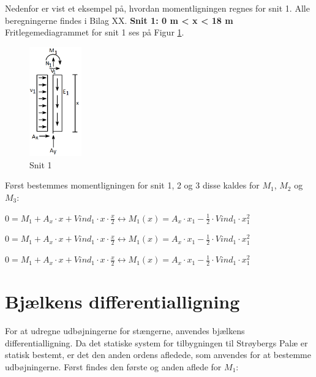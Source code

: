 Nedenfor er vist et eksempel på, hvordan momentligningen regnes for snit 1. Alle beregningerne findes i Bilag XX.
\newline
\newline
\textbf{Snit 1: 0 m < x < 18 m}
\newline
Fritlegemediagrammet for snit 1 ses på Figur \ref{fig:snitetan}.
\begin{figure}[H]
	\centering
	\includegraphics[width=0.2\textwidth]{billeder/asnitet.png}
	\caption{Snit 1}
	\label{fig:snitetan}
\end{figure}


Først bestemmes momentligningen for snit 1, 2 og 3 disse kaldes for $M_1$, $M_2$ og $M_3$:
\begin{center}
	$0 = M_1 + A_x \cdot x + Vind_1\cdot x\cdot \frac{x}{2} \leftrightarrow M_1(x) = A_x\cdot x_1 -\frac{1}{2}\cdot Vind_1 \cdot x_1^2$
\end{center}

\begin{center}
	$0 = M_1 + A_x \cdot x + Vind_1\cdot x\cdot \frac{x}{2} \leftrightarrow M_1(x) = A_x\cdot x_1 -\frac{1}{2}\cdot Vind_1 \cdot x_1^2$
\end{center}

\begin{center}
	$0 = M_1 + A_x \cdot x + Vind_1\cdot x\cdot \frac{x}{2} \leftrightarrow M_1(x) = A_x\cdot x_1 -\frac{1}{2}\cdot Vind_1 \cdot x_1^2$
\end{center}

\section{Bjælkens differentialligning}
For at udregne udbøjningerne for stængerne, anvendes bjælkens differentialligning. Da det statiske system for tilbygningen til Strøybergs Palæ er statisk bestemt, er det den anden ordens afledede, som anvendes for at bestemme udbøjningerne.
\newline
Først findes den første og anden aflede for $M_1$: 
 
